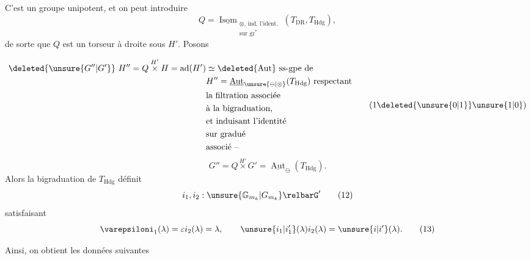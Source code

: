 \begingroup\makeatletter\tagsleft@true\makeatother
C'est un groupe unipotent, et on peut introduire
\[
Q=\underline{\operatorname{Isom}}_{\substack{\otimes,\,\text{ind. l'ident.}\\\text{sur }\operatorname{gr}^{*}}}(T_{\mathrm{DR}},T_{\mathrm{Hdg}}),\tag*{(9)}
\]
de sorte que $Q$ est un torseur à droite sous $H'$. Posons

\reversemarginpar
{}
\normalmarginpar
\[
\begin{aligned}
\deleted{\unsure{G''|G'}}\ H''=Q\overset{H'}{\times}H=\operatorname{ad}(H')&\simeq\deleted{\operatorname{Aut}}\ \text{ss-gpe de}\\
&H''=\underline{\operatorname{Aut}}_{\unsure{\ominus|\otimes}}(T_{\mathrm{Hdg}})\ \text{respectant}\\
&\text{la filtration associée}\\
&\text{à la bigraduation,}\\
&\text{et induisant l'identité}\\
&\text{sur gradué}\\
&\text{associé --}
\end{aligned}\tag*{(1\deleted{\unsure{0|1}}\unsure{1|0})}
\]
\[
G''=Q\overset{H'}{\times}G'=\underline{\operatorname{Aut}}_{\ominus}(T_{\mathrm{Hdg}}).\tag*{(10)}
\]
Alors la bigraduation de $T_{\mathrm{Hdg}}$ définit
\[
i_1,i_2:\unsure{\mathbb{G}_{m_k}|G_{m_k}}\relbarG'\tag*{(12)}
\]
satisfaisant
\[
\varepsiloni_1(\lambda)=\varepsilon i_2(\lambda)=\lambda,\qquad \unsure{i_1|i'_1}(\lambda)i_2(\lambda)=\unsure{i|i'}(\lambda).\tag*{(13)}
\]

Ainsi, on obtient les données suivantes

